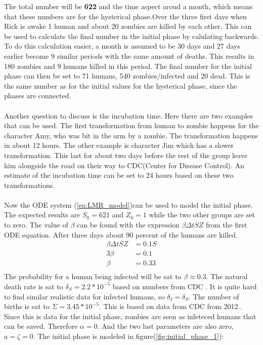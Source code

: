 \documentclass[%
twoside,                 %
final,                   %
10pt]{article}
\begin{document}
\noindent
The total number will be \textbf{622} and the time aspect aroud a month, which means that these numbers are for the hysterical phase.Over the three first days when Rick is awake 1 human and about 20 zombies are killed by each other. This can be used to calculate the final number in the initial phase by calulating backwards. To do this calculation easier, a month is assumed to be 30 days and 27 days earlier become 9 similar periods  with the same amount of deaths. This results in 180 zombies and 9 humans killed in this period. The final number for the initial phase can then be set to 71 humans, 540 zombies/infected and 20 dead. This is the same number as for the initial values for the hysterical phase, since the phases are connected.
\\
\\
Another question to discuss is the incubation time. Here there are two examples that can be used. The first transformation from human to zombie happens for the character Amy, who was bit in the arm by a zombie. The transformation happens in about 12 hours. The other example is character Jim which has a slower transformation. This last for about two days before the rest of the group leave him alongside the road on their way to CDC(Center for Disease Control). An estimate of the incubation time can be set to 24 hours based on these two transformations.
\\
\\
Now the ODE system (\ref{eq:LMR_model})can be used to model the initial phase. The expected results are $S_0 = 621$ and $Z_0 = 1$ while the two other groups are set to zero. The value of $\beta$ can be found with the expression $\beta \Delta t S Z$ from the first ODE equation. After three days about 90 percent of the humans are killed.
\begin{equation}
	\begin{aligned}
	\beta\Delta t S Z &= 0.1 S\\
	3\beta   &= 0.1 \\
	\beta &= 0.33 \\
	\end{aligned}
\end{equation}
The probability for a human being infected will be sat to $\beta \approx 0.3$. The natural death rate is sat to $\delta_S = 2.2*10^{-5}$ based on numbers from CDC \cite{CBC_deaths_2011}. It is quite hard to find similar realistic data for infected humans, so $\delta_I = \delta_S$. The number of births is sat to $\Sigma = 3.45*10^{-5}$. This is based on data from CDC from 2012 \cite{CBC_births_2012}. Since this is data for the initial phase, zombies are seen as infeteced humans that can be saved. Therefore $\alpha = 0$. And the two last parameters are also zero, $a = \zeta = 0$. The initial phase is modeled in figure(\ref{fig:initial_phase_1}):
\end{document}
